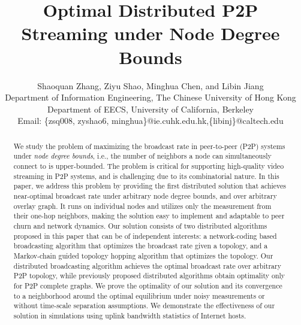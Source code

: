 \documentclass[10pt,conference]{IEEEtran}
\title{
Optimal Distributed P2P Streaming under Node Degree Bounds
}
\author{{\large Shaoquan Zhang, Ziyu Shao, Minghua Chen, and Libin Jiang}
\\
Department of Information Engineering, The Chinese University of
Hong Kong
\\
Department of EECS, University of California, Berkeley
\\
Email: \{zsq008, zyshao6, minghua\}@ie.cuhk.edu.hk,\{libinj\}@caltech.edu }
\begin{document}
\maketitle

\begin{abstract}
We study the problem of maximizing the broadcast rate in peer-to-peer
(P2P) systems under \emph{node degree bounds}, i.e., the number of
neighbors a node can simultaneously connect to is upper-bounded. The
problem is critical for supporting high-quality video streaming in
P2P systems, and is challenging due to its combinatorial nature. In
this paper, we address this problem by providing the first distributed
solution that achieves near-optimal broadcast rate under arbitrary
node degree bounds, and over arbitrary overlay graph. It runs on individual
nodes and utilizes only the measurement from their one-hop neighbors,
making the solution easy to implement and adaptable to peer churn
and network dynamics. Our solution consists of two distributed algorithms
proposed in this paper that can be of independent interests: a network-coding
based broadcasting algorithm that optimizes the broadcast rate given
a topology, and a Markov-chain guided topology hopping algorithm that optimizes
the topology. Our distributed broadcasting algorithm achieves the
optimal broadcast rate over arbitrary P2P topology, while previously
proposed distributed algorithms obtain optimality only for P2P complete
graphs. We prove the optimality of our solution and its convergence
to a neighborhood around the optimal equilibrium under noisy measurements
or without time-scale separation assumptions. We demonstrate the effectiveness
of our solution in simulations using uplink bandwidth statistics of
Internet hosts.
\end{abstract}
\end{document}
